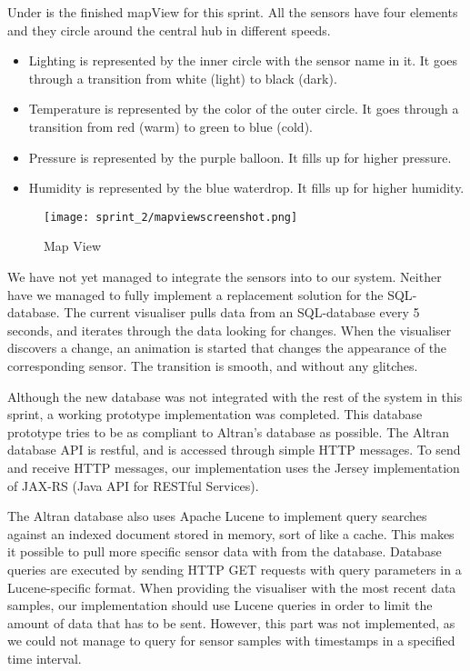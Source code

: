 \documentclass[../document]{subfiles}
\begin{document}
Under is the finished mapView for this sprint. All the sensors have four elements and they circle around the central hub in different speeds.

\begin{itemize}
\item
Lighting is represented by the inner circle with the sensor name in it. It goes through a transition from white (light) to black (dark).
\item
Temperature is represented by the color of the outer circle. It goes through a transition from red (warm) to green to blue (cold).
\item
Pressure is represented by the purple balloon. It fills up for higher pressure.
\item
Humidity is represented by the blue waterdrop. It fills up for higher humidity.
\end{itemize}

\begin{figure}[H]
	\centering
	\texttt{[image: sprint\_2/mapviewscreenshot.png]}
	\caption{Map View}
\end{figure}

We have not yet managed to integrate the sensors into to our system. Neither have we managed to fully implement a replacement solution for the \gls{SQL}-database. The current visualiser pulls data from an \gls{SQL}-database every 5 seconds, and iterates through the data looking for changes. When the visualiser discovers a change, an animation is started that changes the appearance of the corresponding sensor. The transition is smooth, and without any glitches.

Although the new database was not integrated with the rest of the system in this sprint, a working prototype implementation was completed. This database prototype tries to be as compliant to Altran’s database as possible. The \gls{Altran} database API is restful, and is accessed through simple HTTP messages. To send and receive HTTP messages, our implementation uses the Jersey implementation of JAX-RS (Java API for RESTful Services).

The \gls{Altran} database also uses Apache Lucene to implement query searches against an indexed document stored in memory, sort of like a cache. This makes it possible to pull more specific sensor data with from the database. Database queries are executed by sending HTTP GET requests with query parameters in a Lucene-specific format. When providing the visualiser with the most recent data samples, our implementation should use Lucene queries in order to limit the amount of data that has to be sent. However, this part was not implemented, as we could not manage to query for sensor samples with timestamps in a specified time interval.
\end{document}
